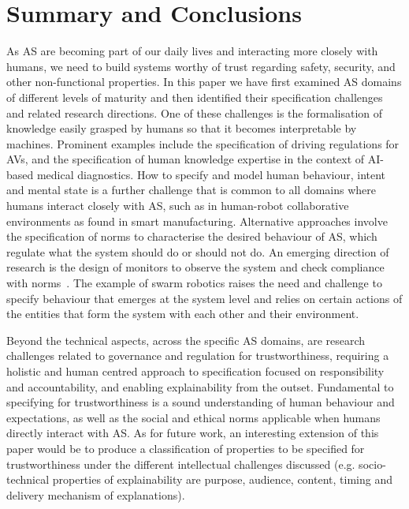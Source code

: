 \documentclass[sigconf,nonacm]{acmart}%
\begin{document}
	\section{Summary and Conclusions}\label{conclusions}	
	As AS are becoming part of our daily lives and interacting more closely with humans, we need to build systems worthy of trust regarding safety, security, and other non-functional properties. In this paper we have first examined AS domains of different levels of maturity and then identified their specification challenges and related research directions. 
	One of these challenges is the formalisation of knowledge easily grasped by humans so that it becomes interpretable by machines. Prominent examples include the specification of driving regulations for AVs, and the specification of human knowledge expertise in the context of AI-based medical diagnostics. 
	How to specify and model human behaviour, intent and mental state is a further challenge that is common to all domains where humans interact closely with AS, such as in human-robot collaborative environments as found in smart manufacturing. 
	Alternative approaches involve the specification of norms to characterise the desired behaviour of AS, which regulate what the system should do or should not do. An emerging direction of research is the design of monitors to observe the system and check compliance with norms~\cite{Criado:2018}. 
	The example of swarm robotics raises the need and challenge to specify behaviour that emerges at the system level and relies on certain actions of the entities that form the system with each other and their environment. 
	
	Beyond the technical aspects, across the specific AS domains, are research challenges related to governance and regulation for trustworthiness, requiring a holistic and human centred approach to specification focused on responsibility and accountability, and enabling explainability from the outset. 
	Fundamental to specifying for trustworthiness is a sound understanding of human behaviour and expectations, as well as the social and ethical norms applicable when humans directly interact with AS. 
	As for future work, an interesting extension of this paper would be to produce a classification of properties to be specified for trustworthiness under the different intellectual challenges discussed (e.g. socio-technical properties of explainability are purpose, audience, content, timing and delivery mechanism of explanations). 
	
\end{document}
